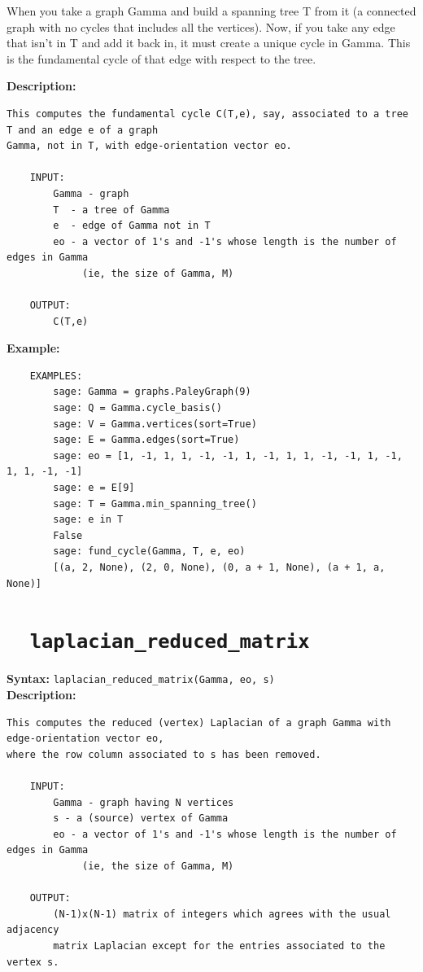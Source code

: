 \documentclass{article}
\begin{document}
When you take a graph Gamma and build a spanning tree T from it (a connected graph
with no cycles that includes all the vertices). Now, if you take any edge that
isn't in T and add it back in, it must create a unique cycle in Gamma. This is
the fundamental cycle of that edge with respect to the tree.


\textbf{Description:}
\begin{verbatim}
This computes the fundamental cycle C(T,e), say, associated to a tree T and an edge e of a graph 
Gamma, not in T, with edge-orientation vector eo. 

    INPUT:
        Gamma - graph
        T  - a tree of Gamma
        e  - edge of Gamma not in T
        eo - a vector of 1's and -1's whose length is the number of edges in Gamma
             (ie, the size of Gamma, M)

    OUTPUT:
        C(T,e)
\end{verbatim}

\textbf{Example:}
\begin{verbatim}
    EXAMPLES:
        sage: Gamma = graphs.PaleyGraph(9)
        sage: Q = Gamma.cycle_basis()
        sage: V = Gamma.vertices(sort=True)
        sage: E = Gamma.edges(sort=True)
        sage: eo = [1, -1, 1, 1, -1, -1, 1, -1, 1, 1, -1, -1, 1, -1, 1, 1, -1, -1]
        sage: e = E[9]
        sage: T = Gamma.min_spanning_tree()
        sage: e in T
        False
        sage: fund_cycle(Gamma, T, e, eo)
        [(a, 2, None), (2, 0, None), (0, a + 1, None), (a + 1, a, None)]
\end{verbatim}

\section{\tt \ \ laplacian\_reduced\_matrix}

\textbf{Syntax:} \verb}laplacian_reduced_matrix(Gamma, eo, s)}\\

\textbf{Description:}
\begin{verbatim}
This computes the reduced (vertex) Laplacian of a graph Gamma with edge-orientation vector eo, 
where the row column associated to s has been removed.

    INPUT:
        Gamma - graph having N vertices
        s - a (source) vertex of Gamma
        eo - a vector of 1's and -1's whose length is the number of edges in Gamma
             (ie, the size of Gamma, M)

    OUTPUT:
        (N-1)x(N-1) matrix of integers which agrees with the usual adjacency 
        matrix Laplacian except for the entries associated to the vertex s.
\end{verbatim}
\end{document}
